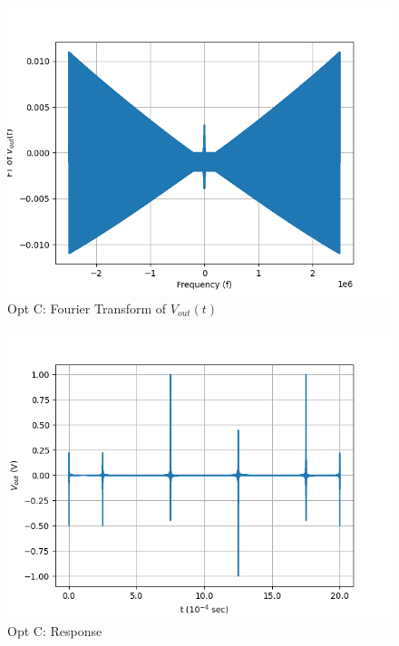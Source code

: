 \documentclass[journal,12pt,twocolumn]{IEEEtran}
\theoremstyle{remark}
\begin{document}
\begin{figure}[!h]
    \centering
    \includegraphics[width = \columnwidth]{2023/PH/37/figs/opt_c_ft.png}
    \caption{Opt C: Fourier Transform of $V_{out}(t)$}
    \label{fig:c_ft_gate.ph.23.37}
\end{figure}
\begin{figure}[!h]
    \centering
    \includegraphics[width = \columnwidth]{2023/PH/37/figs/opt_c_res.png}
    \caption{Opt C: Response}
    \label{fig:c_res_gate.ph.23.37}
\end{figure}
\end{document}
